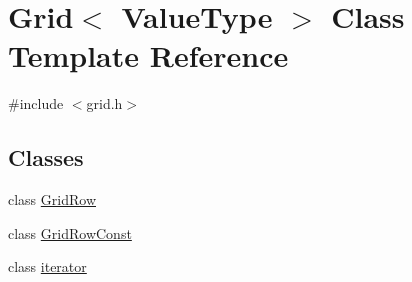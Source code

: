 \hypertarget{classGrid}{}\section{Grid$<$ Value\+Type $>$ Class Template Reference}
\label{classGrid}


{\ttfamily \#include $<$grid.\+h$>$}

\subsection*{Classes}
\begin{DoxyCompactItemize}
\item 
class \mbox{\hyperlink{classGrid_1_1GridRow}{Grid\+Row}}
\item 
class \mbox{\hyperlink{classGrid_1_1GridRowConst}{Grid\+Row\+Const}}
\item 
class \mbox{\hyperlink{classGrid_1_1iterator}{iterator}}
\end{DoxyCompactItemize}
